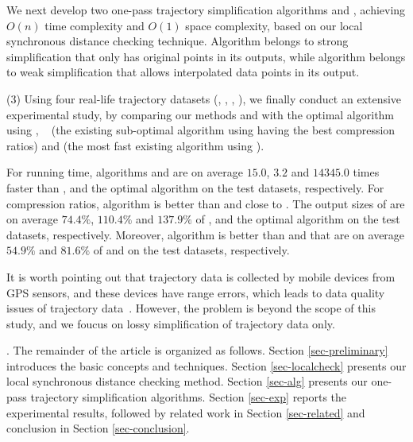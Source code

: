
 We next develop two one-pass trajectory simplification algorithms \cist and \cista, achieving $O(n)$ time complexity and $O(1)$ space complexity, based on our local synchronous distance checking technique.
Algorithm \cist belongs to strong simplification that only has original points in its outputs, while algorithm \cista belongs to weak simplification that allows interpolated data points in its output.


\sstab (3) Using four real-life trajectory datasets (\truck, \sercar, \geolife, \pricar),
we finally conduct an extensive experimental study, by comparing our methods \cist and \cista  with the optimal \lsa algorithm using \sed, \dps~\cite{Meratnia:Spatiotemporal} (the existing sub-optimal \lsa algorithm using \sed having the best compression ratios) and \squishe \cite{Muckell:Compression} (the most fast existing \lsa algorithm using \sed).

For running time,
algorithms \cist and \cista are on average $15.0$, $3.2$ and $14345.0$ times faster than \dps, \squishe and the optimal \lsa algorithm on the test datasets, respectively.
%
For compression ratios, algorithm \cist is better than \squishe and close to \dps. The output sizes of \cist are on average $74.4\%$, $110.4\%$ and $137.9\%$ of \squishe, \dps and the optimal \lsa algorithm on the test datasets, respectively.
Moreover, algorithm \cista is better than \squishe and \dps that are on average $54.9\%$ and $81.6\%$ of \squishe and \dps on the test datasets, respectively.

It is worth pointing out that trajectory data is collected by mobile devices from GPS sensors, and these devices have range errors, which leads to data quality issues of  trajectory data~\cite{PfoserJ99,ZufleTPRRLDE17}. However, the problem is beyond the scope of this study, and we foucus on lossy simplification of trajectory data only.


.
The remainder of the article is organized as follows.
Section \ref{sec-preliminary} introduces the basic concepts and techniques.
Section \ref{sec-localcheck} presents our local synchronous distance checking method.
Section \ref{sec-alg} presents our one-pass trajectory simplification algorithms.
Section \ref{sec-exp} reports the experimental results, followed by related work in
Section \ref{sec-related} and conclusion in Section \ref{sec-conclusion}.





